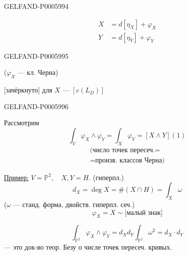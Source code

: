 \begin{GelfandAdjacentEvidence}{GELFAND-P000599}{4}

\[
\begin{aligned}
X&=d[\eta_X]+\varphi_X\\
Y&=d[\eta_Y]+\varphi_Y
\end{aligned}
\]
\end{GelfandAdjacentEvidence}
\begin{GelfandAdjacentEvidence}{GELFAND-P000599}{5}

\hfill(\(\varphi_X\) — кл. Черна)\par
\hfill [зачёркнуто] для \(X\) — \([c(L_D)]\)\par
{}
\end{GelfandAdjacentEvidence}
\begin{GelfandAdjacentEvidence}{GELFAND-P000599}{6}


Рассмотрим
\[
\int_V\varphi_X\wedge\varphi_Y=\int_X\varphi_Y=[X\wedge Y](1)
\]
\begin{gather*}
\text{(число точек пересеч.}={}\\[-.16em]
{}=\text{произв. классов Черна)}
\end{gather*}

\underline{Пример:} \(V=\mathbb P^2,\quad X,Y=H\). (гиперпл.)
\[
d_X=\operatorname{deg}X=\#(X\cap H)=\int_X\omega
\]
(\(\omega\) — станд. форма, двойств. гиперпл. сеч.)
\[
\varphi_X=X\sim\text{[малый знак]}
\]
\end{GelfandAdjacentEvidence}

\[
\int_{\mathbb P^2}\varphi_X\wedge\varphi_Y=d_Xd_Y\int_{\mathbb P^2}\omega^2=d_X\cdot d_Y
\]
— это док-во теор. Безу о числе точек пересеч. кривых.


